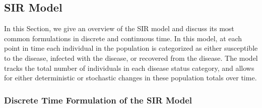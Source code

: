 \documentclass[fleqn]{article}\usepackage[]{graphicx}\usepackage[]{color}
\begin{document}
\subsection{SIR Model}
\label{subsec:ModelFormulation:SIR}

In this Section, we give an overview of the SIR model and discuss its most common formulations in discrete and continuous time.  In this model, at each point in time each individual in the population is categorized as either susceptible to the disease, infected with the disease, or recovered from the disease.  The model tracks the total number of individuals in each disease status category, and allows for either deterministic or stochastic changes in these population totals over time.


\subsubsection{Discrete Time Formulation of the SIR Model}
\label{subsubsec:ModelFormulation:SIR:DiscreteTime}

\end{document}
